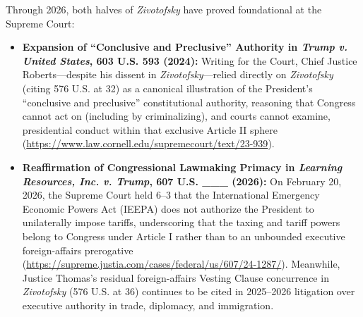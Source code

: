 \documentclass[12pt]{article}
\begin{document}
Through 2026, both halves of \textit{Zivotofsky} have proved foundational at the Supreme Court:
\begin{itemize}
  \item \textbf{Expansion of ``Conclusive and Preclusive'' Authority in \textit{Trump v. United States}, 603 U.S. 593 (2024):} Writing for the Court, Chief Justice Roberts---despite his dissent in \textit{Zivotofsky}---relied directly on \textit{Zivotofsky} (citing 576 U.S. at 32) as a canonical illustration of the President's ``conclusive and preclusive'' constitutional authority, reasoning that Congress cannot act on (including by criminalizing), and courts cannot examine, presidential conduct within that exclusive Article II sphere (\url{https://www.law.cornell.edu/supremecourt/text/23-939}).
  \item \textbf{Reaffirmation of Congressional Lawmaking Primacy in \textit{Learning Resources, Inc. v. Trump}, 607 U.S. \_\_\_ (2026):} On February 20, 2026, the Supreme Court held 6--3 that the International Emergency Economic Powers Act (IEEPA) does not authorize the President to unilaterally impose tariffs, underscoring that the taxing and tariff powers belong to Congress under Article I rather than to an unbounded executive foreign-affairs prerogative (\url{https://supreme.justia.com/cases/federal/us/607/24-1287/}). Meanwhile, Justice Thomas's residual foreign-affairs Vesting Clause concurrence in \textit{Zivotofsky} (576 U.S. at 36) continues to be cited in 2025--2026 litigation over executive authority in trade, diplomacy, and immigration.
\end{itemize}
\end{document}
